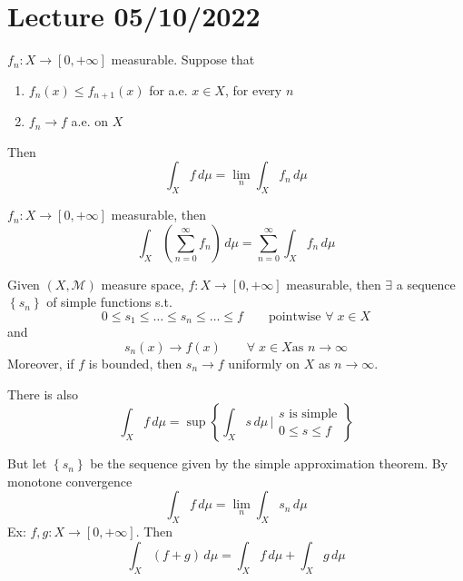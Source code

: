 \section{Lecture 05/10/2022}
\begin{theorem}
    \(f_n : X \to [0, +\infty]\) measurable. Suppose that 
    \begin{enumerate}
        \item \(f_n(x) \leq f_{n+1}(x)\) for a.e. \(x \in X\), for every \(n\)
        \item \(f_n \to f\) a.e. on \(X\) 
    \end{enumerate}
    Then 
    \[
        \int_X f \, d\mu = \lim_n \int_X f_n \, d\mu
    \]
\end{theorem}

\begin{corollary}
    \(f_n : X \to [0, +\infty]\) measurable, then 
    \[
        \int_X \left( \sum_{n=0}^{\infty} f_n\right) \, d\mu = \sum_{n=0}^{\infty} \int_X f_n \, d\mu
    \]
\end{corollary}

\begin{theorem}
    Given \((X, \mathcal{M})\) measure space, \(f: X \to [0, +\infty]\) measurable, then \(\exists\) a sequence \(\left\{ s_n \right\}\) of simple functions s.t. 
    \[
        0 \leq s_1 \leq \ldots \leq s_n \leq \ldots \leq f \qquad \text{pointwise } \forall \; x \in X
    \]
    and 
    \[
        s_n (x) \to f(x) \qquad \forall \; x \in X \text{as } n \to \infty 
    \]
    Moreover, if \(f\) is bounded, then \(s_n \to f\) uniformly on \(X\) as \(n \to \infty\).
\end{theorem}

\begin{remark}
    There is also
    \[
        \int_X f \, d\mu = \sup \left\{ \int_X s \, d\mu \, \bigg\vert \begin{array}{l}s\text{ is simple} \\ 0 \leq s \leq f \end{array}\right\}
    \]
\end{remark}

But let \(\left\{ s_n \right\}\) be the sequence given by the simple approximation theorem. By monotone convergence 
\[
    \int_X f \, d\mu = \lim_n \int_X s_n \, d\mu
\]
Ex: \(f, g : X \to [0, +\infty]\). Then 
\[
    \int_X (f+g) \, d\mu = \int_X f \, d\mu + \int_X g \, d\mu
\]

